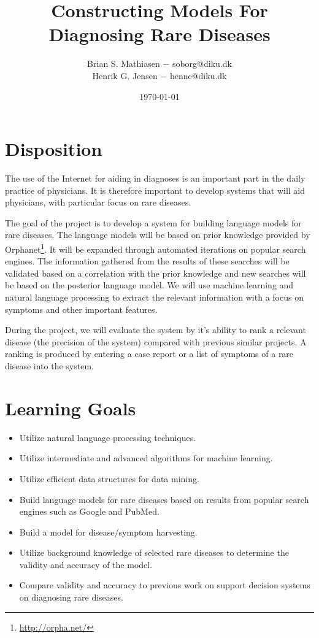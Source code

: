 \documentclass[10pt,letterpaper,final]{article}
\title{Constructing Models For Diagnosing Rare Diseases}
\author{Brian S. Mathiasen $-$ soborg@diku.dk \\
        Henrik G. Jensen $-$ henne@diku.dk\\
}
\date{\today} %
\begin{document}
\maketitle
\section{Disposition}

The use of the Internet for aiding in diagnoses is an important part in
the daily practice of physicians. It is therefore important to develop
systems that will aid physicians, with particular focus on rare
diseases.

The goal of the project is to develop a system for building language
models for rare diseases. The language models will be based on prior
knowledge provided by Orphanet\footnote{\url{http://orpha.net/}}. It
will be expanded through automated iterations on popular search engines.
The information gathered from the results of these searches will be
validated based on a correlation with the prior knowledge and new
searches will be based on the posterior language model. We will use
machine learning and natural language processing to extract the relevant
information with a focus on symptoms and other important features.

During the project, we will evaluate the system by it’s ability to rank
a relevant disease (the precision of the system) compared with previous
similar projects. A ranking is produced by entering a case report or a
list of symptoms of a rare disease into the system.


\section{Learning Goals}
\begin{itemize}
\item Utilize natural language processing techniques.
\item Utilize intermediate and advanced algorithms for machine learning.
\item Utilize efficient data structures for data mining.
\item Build language models for rare diseases based on results from
popular search engines such as Google and PubMed.
\item Build a model for disease/symptom harvesting.
\item Utilize background knowledge of selected rare diseases to
determine the validity and accuracy of the model.
\item Compare validity and accuracy to previous work on support decision
systems on diagnosing rare diseases.
\end{itemize}
\end{document}
